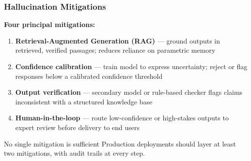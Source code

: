 \documentclass[9pt,t]{beamer}
\begin{document}
\begin{frame}
\frametitle{Hallucination Mitigations}

\textbf{Four principal mitigations:}

\begin{enumerate}
  \item \textbf{Retrieval-Augmented Generation (RAG)} --- ground outputs in
        retrieved, verified passages; reduces reliance on parametric memory
  \item \textbf{Confidence calibration} --- train model to express uncertainty;
        reject or flag responses below a calibrated confidence threshold
  \item \textbf{Output verification} --- secondary model or rule-based checker
        flags claims inconsistent with a structured knowledge base
  \item \textbf{Human-in-the-loop} --- route low-confidence or high-stakes outputs
        to expert review before delivery to end users
\end{enumerate}

\medskip
\begin{alertblock}{No single mitigation is sufficient}
  Production deployments should layer at least two mitigations,
  with audit trails at every step.
\end{alertblock}
\end{frame}
\end{document}
